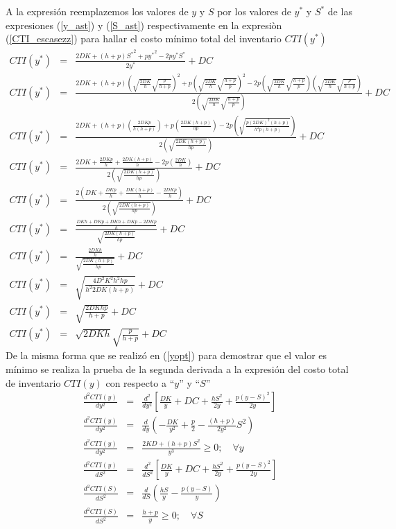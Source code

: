A la expresión reemplazemos los valores de $y$ y $S$ por los valores de $y^*$ y $S^*$ de las expresiones (\ref{y_ast}) y (\ref{S_ast}) respectivamente en la expresiòn (\ref{CTI_escasezz}) para hallar el costo mínimo total del inventario $CTI(y^*)$
\begin{eqnarray}
	CTI(y^*) &=& \frac{2DK + (h+p){S^*}^{2} + p{y^*}^{2} - 2py^*S^*}{2y^*} + DC \nonumber \\
	CTI(y^*) &=& \frac{2DK + (h+p){\left( \sqrt{\frac{2DK}{h}}\sqrt{\frac{p}{h+p}} \right)}^{2} + p{\left( \sqrt{\frac{2DK}{h}} \sqrt{\frac{h+p}{p}} \right)}^{2} - 2p\left( \sqrt{\frac{2DK}{h}} \sqrt{\frac{h+p}{p}} \right) \left( \sqrt{\frac{2DK}{h}}\sqrt{\frac{p}{h+p}} \right)}{2\left( \sqrt{\frac{2DK}{h}} \sqrt{\frac{h+p}{p}} \right)} + DC \nonumber \\
	CTI(y^*) &=& \frac{2DK + (h+p)\left( \frac{2DKp}{h(h+p)} \right) + p \left( \frac{2DK(h+p)}{hp} \right) - 2p \left( \sqrt{\frac{p{(2DK)}^{2}(h+p)}{h^2 p (h+p)}} \right) }{2 \left(\sqrt{\frac{2DK(h+p)}{hp}} \right)} + DC \nonumber \\
	CTI(y^*) &=& \frac{2DK + \frac{2DKp}{h}  + \frac{2DK(h+p)}{h} - 2p \left( \frac{2DK}{h} \right) }{2 \left(\sqrt{\frac{2DK(h+p)}{hp}} \right)} + DC \nonumber \\
	CTI(y^*) &=& \frac{2 \left( DK + \frac{DKp}{h}  + \frac{DK(h+p)}{h} - \frac{2DKp}{h} \right) }{2 \left(\sqrt{\frac{2DK(h+p)}{hp}} \right)} + DC \nonumber \\
	CTI(y^*) &=& \frac{\frac{DKh + DKp + DKh + DKp - 2DKp}{h}}{\sqrt{\frac{2DK(h+p)}{hp}}} + DC \nonumber \\
	CTI(y^*) &=& \frac{\frac{2DKh}{h}}{\sqrt{\frac{2DK(h+p)}{hp}}} + DC \nonumber \\
	CTI(y^*) &=& \sqrt{\frac{4D^2 K^2 h^2 hp}{h^2 2DK (h+p)}} + DC \nonumber \\
	CTI(y^*) &=& \sqrt{\frac{2DKhp}{h+p}} + DC \nonumber \\
	CTI(y^*) &=& \sqrt{2DKh} \sqrt{\frac{p}{h+p}} + DC
\end{eqnarray}
De la misma forma que se realizó en (\ref{yopt}) para demostrar que el valor es mínimo se realiza la prueba de la segunda derivada a la expresión del costo total de inventario $CTI(y)$ con respecto a ``$y$'' y ``$S$''
\newpage
\begin{eqnarray}
	\label{minimo2}
	\frac{d^2 CTI(y)}{dy^2} &=& \frac{d^2}{dy^2} \left[ \frac{DK}{y} + DC + \frac{hS^2}{2y}+\frac{p{(y-S)}^{2}}{2y} \right] \nonumber \\
	\frac{d^2 CTI(y)}{dy^2} &=& \frac{d}{dy} \left( - \frac{DK}{y^2} + \frac{p}{2} - \frac{(h + p)}{2y^2}S^2 \right) \nonumber \\
	\frac{d^2 CTI(y)}{dy^2} &=& \frac{2KD + (h+p)S^2}{y^3} \geq 0; \quad \forall y \\
	\frac{d^2 CTI(y)}{dS^2} &=& \frac{d^2}{dS^2} \left[ \frac{DK}{y} + DC + \frac{hS^2}{2y}+\frac{p{(y-S)}^{2}}{2y} \right] \nonumber \\
	\frac{d^2 CTI(S)}{dS^2} &=& \frac{d}{dS} \left( \frac{hS}{y} - \frac{p(y-S)}{y} \right) \nonumber \\
	\frac{d^2 CTI(S)}{dS^2} &=& \frac{h+p}{y} \geq 0; \quad \forall S
\end{eqnarray}
